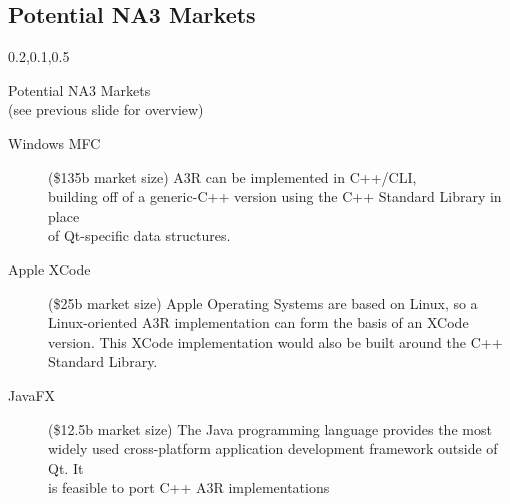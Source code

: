 
\begin{frame}{}
\section{Potential NA3 Markets}

\vspace{-3.5em}	

	
{\Large{}\selectfont
\vspace{1em}
\begin{center}
\begin{minipage}{\textwidth}
\vspace{1em}
{\begin{minipage}{\textwidth}%
\begin{lightquadblockc}{0.2,0.1,0.5}{\parbox{21cm}{\vspace*{10pt}\centering Potential NA3 Markets \\(see previous slide for overview)\vspace*{10pt}}}
\hspace{10pt}\begin{minipage}{1.1\textwidth}
{\LARGE {}\selectfont \setlength{\leftmargini}{3pt}\begin{description}
\item[Windows MFC] ({\texttildelow}\$135b market size) A3R can be implemented 
in C++/CLI, \\building off of a generic-C++ version using 
the C++ Standard Library in place \\of Qt-specific data structures.\vspace{10pt} 	
\item[Apple XCode] ({\texttildelow}\$25b market size) Apple Operating Systems 
are based on Linux, so a Linux-oriented A3R implementation can 
form the basis of an XCode version.  This XCode implementation 
would also be built around the C++ Standard Library. \vspace{10pt}
\item[JavaFX] ({\texttildelow}\$12.5b market size)  The Java programming 
language provides the most widely used cross-platform 
application development framework outside of Qt.  
It \\is feasible to port C++ A3R implementations 

\end{description}}
\end{minipage}
\end{lightquadblockc}
\end{minipage}}
\end{minipage}
\end{center}}
\end{frame}
